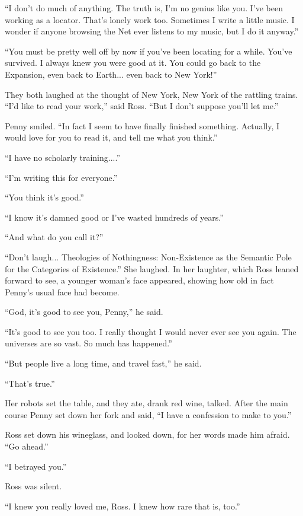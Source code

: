 \documentclass[english,11pt,letterpaper,onecolumn]{scrbook}
\begin{document}
	``I don't do much of anything.  The truth is, I'm no genius like you.  I've been working as a locator.  That's lonely work too.  Sometimes I write a little music.  I wonder if anyone browsing the Net ever listens to my music, but I do it anyway.''

	``You must be pretty well off by now if you've been locating for a while.  You've survived.  I always knew you were good at it.  You could go back to the Expansion, even back to Earth... even back to New York!''

	They both laughed at the thought of New York, New York of the rattling trains.  ``I'd like to read your work,'' said Ross.  ``But I don't suppose you'll let me.''

	Penny smiled.  ``In fact I seem to have finally finished something.  Actually, I would love for you to read it, and tell me what you think.''

	``I have no scholarly training....''

	``I'm writing this for everyone.''

	``You think it's good.''

	``I know it's damned good or I've wasted hundreds of years.''

	``And what do you call it?''

	``Don't laugh... Theologies of Nothingness:  Non-Existence as the Semantic Pole for the Categories of Existence.''  She laughed.  In her laughter, which Ross leaned forward to see, a younger woman's face appeared, showing how old in fact Penny's usual face had become.  

	``God, it's good to see you, Penny,'' he said.

	``It's good to see you too.  I really thought I would never ever see you again.  The universes are so vast.  So much has happened.''

	``But people live a long time, and travel fast,'' he said.

	``That's true.''

	Her robots set the table, and they ate, drank red wine, talked.  After the main course Penny set down her fork and said, ``I have a confession to make to you.''

	Ross set down his wineglass, and looked down, for her words made him afraid.  ``Go ahead.''

	``I betrayed you.''

	Ross was silent.

	``I knew you really loved me, Ross.  I knew how rare that is, too.''
\end{document}
